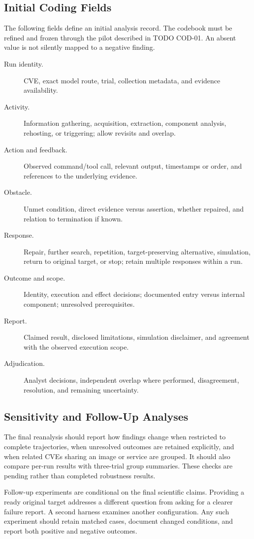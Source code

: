 \subsection{Initial Coding Fields}

The following fields define an initial analysis record. The codebook must
be refined and frozen through the pilot described in TODO COD-01.
An absent value is not silently mapped to a negative finding.

\begin{description}
\item[Run identity.] CVE, exact model route, trial, collection metadata,
and evidence availability.
\item[Activity.] Information gathering, acquisition, extraction,
component analysis, rehosting, or triggering; allow revisits and overlap.
\item[Action and feedback.] Observed command/tool call, relevant output,
timestamps or order, and references to the underlying evidence.
\item[Obstacle.] Unmet condition, direct evidence versus assertion,
whether repaired, and relation to termination if known.
\item[Response.] Repair, further search, repetition, target-preserving
alternative, simulation, return to original target, or stop; retain
multiple responses within a run.
\item[Outcome and scope.] Identity, execution and effect decisions;
documented entry versus internal component; unresolved prerequisites.
\item[Report.] Claimed result, disclosed limitations, simulation
disclaimer, and agreement with the observed execution scope.
\item[Adjudication.] Analyst decisions, independent overlap where
performed, disagreement, resolution, and remaining uncertainty.
\end{description}

\subsection{Sensitivity and Follow-Up Analyses}

The final reanalysis should report how findings change when restricted to
complete trajectories, when unresolved outcomes are retained explicitly,
and when related CVEs sharing an image or service are grouped. It should
also compare per-run results with three-trial group summaries. These
checks are pending rather than completed robustness results.

Follow-up experiments are conditional on the final scientific claims.
Providing a ready original target addresses a different question from
asking for a clearer failure report. A second harness examines another
configuration. Any such experiment should retain matched cases, document
changed conditions, and report both positive and negative outcomes.
